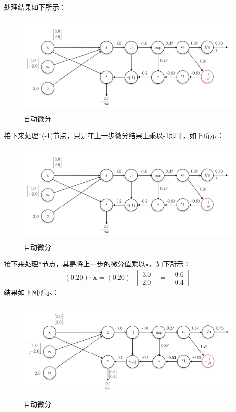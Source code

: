 \documentclass[UTF8]{article}
\begin{document}
处理结果如下所示：
\begin{figure}[H]
	\caption{自动微分}
	\label{f000057}
	\centering
	\includegraphics[height=5cm]{images/f000057}
\end{figure}
接下来处理*(-1)节点，只是在上一步微分结果上乘以-1即可，如下所示：
\begin{figure}[H]
	\caption{自动微分}
	\label{f000058}
	\centering
	\includegraphics[height=5cm]{images/f000058}
\end{figure}
接下来处理*节点，其是将上一步的微分值乘以$\boldsymbol{x}$，如下所示：
\begin{equation}
\begin{aligned}
(0.20) \cdot \boldsymbol{x}=(0.20) \cdot \begin{bmatrix}
3.0\\
2.0
\end{bmatrix}=\begin{bmatrix}
0.6\\
0.4
\end{bmatrix}
\end{aligned}
\label{mlp-sigmoid-cg-19}
\end{equation}
结果如下图所示：
\begin{figure}[H]
	\caption{自动微分}
	\label{f000059}
	\centering
	\includegraphics[height=5cm]{images/f000059}
\end{figure}
\end{document}
